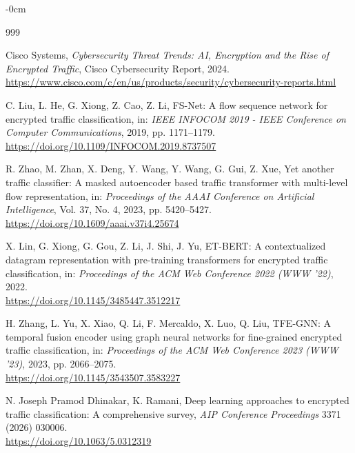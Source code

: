 \documentclass[sensors,article,submit,moreauthors]{Definitions/mdpi}
\begin{document}
\begin{adjustwidth}{-\extralength}{0cm}

\begin{thebibliography}{999}

Cisco Systems, \textit{Cybersecurity Threat Trends: AI, Encryption and the Rise of Encrypted Traffic}, Cisco Cybersecurity Report, 2024. \\
\url{https://www.cisco.com/c/en/us/products/security/cybersecurity-reports.html}



C. Liu, L. He, G. Xiong, Z. Cao, Z. Li, FS-Net: A flow sequence network for encrypted traffic classification, in: \textit{IEEE INFOCOM 2019 - IEEE Conference on Computer Communications}, 2019, pp. 1171--1179. \\
\url{https://doi.org/10.1109/INFOCOM.2019.8737507}



R. Zhao, M. Zhan, X. Deng, Y. Wang, Y. Wang, G. Gui, Z. Xue, Yet another traffic classifier: A masked autoencoder based traffic transformer with multi-level flow representation, in: \textit{Proceedings of the AAAI Conference on Artificial Intelligence}, Vol. 37, No. 4, 2023, pp. 5420--5427. \\
\url{https://doi.org/10.1609/aaai.v37i4.25674}



X. Lin, G. Xiong, G. Gou, Z. Li, J. Shi, J. Yu, ET-BERT: A contextualized datagram representation with pre-training transformers for encrypted traffic classification, in: \textit{Proceedings of the ACM Web Conference 2022 (WWW '22)}, 2022. \\
\url{https://doi.org/10.1145/3485447.3512217}



H. Zhang, L. Yu, X. Xiao, Q. Li, F. Mercaldo, X. Luo, Q. Liu, TFE-GNN: A temporal fusion encoder using graph neural networks for fine-grained encrypted traffic classification, in: \textit{Proceedings of the ACM Web Conference 2023 (WWW '23)}, 2023, pp. 2066--2075. \\
\url{https://doi.org/10.1145/3543507.3583227}



N. Joseph Pramod Dhinakar, K. Ramani, Deep learning approaches to encrypted traffic classification: A comprehensive survey, \textit{AIP Conference Proceedings} 3371 (2026) 030006. \\
\url{https://doi.org/10.1063/5.0312319}




\end{thebibliography}
\end{adjustwidth}
\end{document}
